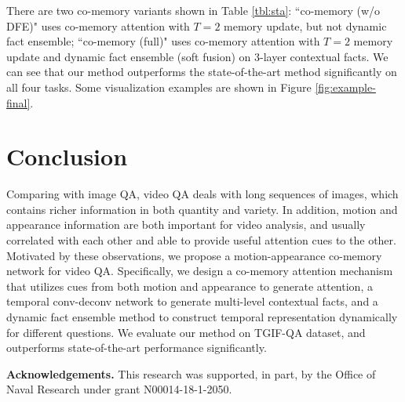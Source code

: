 \documentclass[10pt,twocolumn,letterpaper]{article}
\begin{document}
There are two co-memory variants shown in Table \ref{tbl:sta}: ``co-memory (w/o DFE)" uses co-memory attention with $T=2$ memory update, but not dynamic fact ensemble; ``co-memory (full)" uses co-memory attention with $T=2$ memory update and dynamic fact ensemble (soft fusion) on 3-layer contextual facts. We can see that our method outperforms the state-of-the-art method significantly on all four tasks. Some visualization examples are shown in Figure \ref{fig:example-final}.





\section{Conclusion}
Comparing with image QA, video QA deals with long sequences of images, which contains richer information in both quantity and variety. In addition, motion and appearance information are both important for video analysis, and usually correlated with each other and able to provide useful attention cues to the other. Motivated by these observations, we propose a motion-appearance co-memory network for video QA. Specifically, we design a co-memory attention mechanism that utilizes cues from both motion and appearance to generate attention,  a temporal conv-deconv network to generate multi-level contextual facts, and a dynamic fact ensemble method to construct temporal representation dynamically for different questions. We evaluate our method on TGIF-QA dataset, and outperforms state-of-the-art performance significantly.

\textbf{Acknowledgements.} This research was supported, in part, by the Office of Naval Research under grant N00014-18-1-2050.

{\small


}
\end{document}
